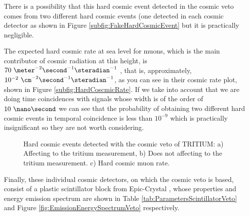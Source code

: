 There is a possibility that this hard cosmic event detected in the cosmic veto comes from two different hard cosmic events (one detected in each cosmic detector as shown in Figure \ref{subfig:FakeHardCosmicEvent} but it is practically negligible.

The expected hard cosmic rate at sea level for muons, which is the main contributor of cosmic radiation at this height, is $70~\meter^{-2}\second^{-1}\steradian^{-1}$ \cite{PDG, HardCosmicMuonRate}, that is, approximately, $10^{-2}~\cm^{-2}\second^{-1}\steradian^{-1}$, as you can see in their cosmic rate plot, shown in Figure \ref{subfig:HardCoscmicRate}. If we take into account that we are doing time coincidences with signals whose width is of the order of $10~\nano\second$ we can see that the probability of obtaining two different hard cosmic events in temporal coincidence is less than $10^{-9}$ which is practically insignificant so they are not worth considering.

\begin{figure}[h]
 \centering
 \caption{Hard cosmic events detected with the cosmic veto of TRITIUM: a) Affecting to the tritium measurement, b) Does not affecting to the tritium measurement. c) Hard cosmic muon rate. }
 \label{fig:HardCosmicEventsSimulation}
\end{figure}

Finally, these individual cosmic detectors, on which the cosmic veto is based, consist of a plastic scintillator block from Epic-Crystal \cite{ScintillatorVeto}, whose properties and energy emission spectrum are shown in Table \ref{tab:ParametersScintillatorVeto} and Figure \ref{fig:EmissionEnergySpectrumVeto} respectively.

